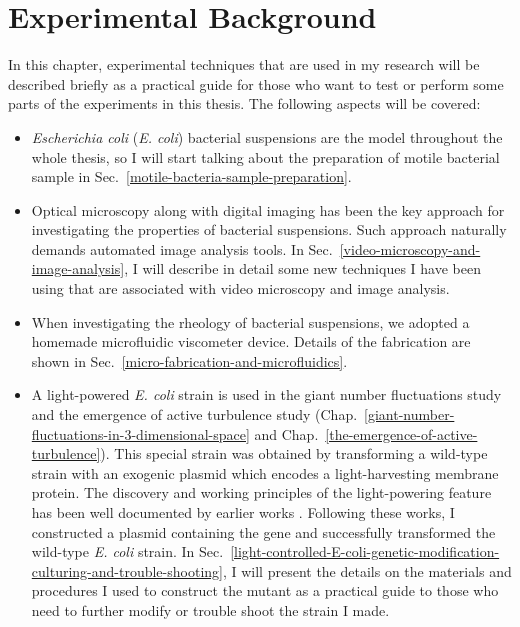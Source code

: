 

\chapter{Experimental Background}
\label{experimental-background}
In this chapter, experimental techniques that are used in my research will be described briefly as a practical guide for those who want to test or perform some parts of the experiments in this thesis. The following aspects will be covered:
\begin{itemize}
\item \textit{Escherichia coli} (\textit{E. coli}) bacterial suspensions are the model throughout the whole thesis, so I will start talking about the preparation of motile bacterial sample in Sec.~\ref{motile-bacteria-sample-preparation}.
\item Optical microscopy along with digital imaging has been the key approach for investigating the properties of bacterial suspensions. Such approach naturally demands automated image analysis tools.
In Sec.~\ref{video-microscopy-and-image-analysis}, I will describe in detail some new techniques I have been using that are associated with video microscopy and image analysis.
\item When investigating the rheology of bacterial suspensions, we adopted a homemade microfluidic viscometer device. Details of the fabrication are shown in Sec.~\ref{micro-fabrication-and-microfluidics}.
\item A light-powered \textit{E. coli} strain is used in the giant number fluctuations study and the emergence of active turbulence study
(Chap.~\ref{giant-number-fluctuations-in-3-dimensional-space} and Chap.~\ref{the-emergence-of-active-turbulence}). This special strain was obtained by transforming a wild-type strain with an exogenic plasmid which encodes a light-harvesting membrane protein. The discovery and working principles of the light-powering feature has been well documented by earlier works
\cite{Beja2000, Subramanlam2000, DelaTorre2003, Walter2007, Claassens2013}. Following these works, I constructed a plasmid containing the gene and successfully transformed the wild-type \textit{E. coli} strain.
In Sec.~\ref{light-controlled-E-coli-genetic-modification-culturing-and-trouble-shooting}, I will present the details on the materials and procedures I used to construct the mutant as a practical guide to those who need to further modify or trouble shoot the strain I made.
\end{itemize}

